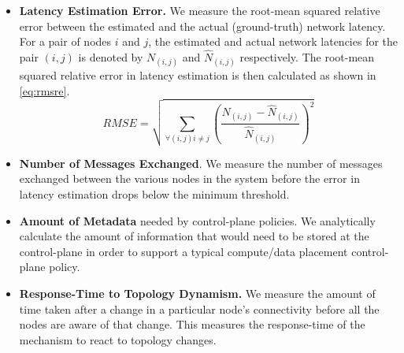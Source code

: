 \begin{itemize}
\item \textbf{Latency Estimation Error.} We measure the root-mean squared relative error between the estimated and the actual (ground-truth) network latency. For a pair of nodes $i$ and $j$, the estimated and actual network latencies for the pair $\left( i, j\right)$ is denoted by $N_{\left( i, j\right)}$ and $\hat{N}_{\left( i, j\right)}$ respectively. The root-mean squared relative error in latency estimation is then calculated as shown in \cref{eq:rmsre}.
\begin{equation}
\label{eq:rmsre}
RMSE = \sqrt{\sum_{\forall \left(i, j \right) i \neq j}{\left(\dfrac{N_{\left( i, j\right)} - \hat{N}_{\left( i, j\right)}}{\hat{N}_{\left( i, j\right)}}\right)^2}}
\end{equation}
\item \textbf{Number of Messages Exchanged}. We measure the number of messages exchanged between the various nodes in the system before the error in latency estimation drops below the minimum threshold.
\item \textbf{Amount of Metadata} needed by control-plane policies. We analytically calculate the amount of information that would need to be stored at the control-plane in order to support a typical compute/data placement control-plane policy.
\item \textbf{Response-Time to Topology Dynamism.} We measure the amount of time taken after a change in a particular node's connectivity before all the nodes are aware of that change. This measures the response-time of the mechanism to react to topology changes.
\end{itemize}

